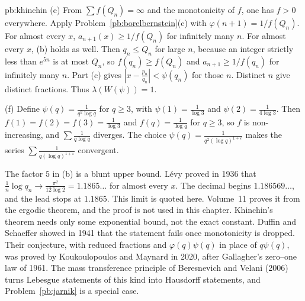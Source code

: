\begin{solution}{pb:khinchin}
(e) From $\sum f(Q_n)=\infty$ and the monotonicity of $f$, one has $f>0$ everywhere. Apply Problem~\ref{pb:borelbernstein}(c) with $\varphi(n+1)=1/f(Q_n)$. For almost every $x$, $a_{n+1}(x)\ge 1/f(Q_n)$ for infinitely many $n$. For almost every $x$, (b) holds as well. Then $q_n\le Q_n$ for large $n$, because an integer strictly less than $e^{5n}$ is at most $Q_n$, so $f(q_n)\ge f(Q_n)$ and $a_{n+1}\ge 1/f(q_n)$ for infinitely many $n$. Part (c) gives $|x-\frac{p_n}{q_n}|<\psi(q_n)$ for those $n$. Distinct $n$ give distinct fractions. Thus $\lambda(W(\psi))=1$.

(f) Define $\psi(q)=\frac1{q^2\log q}$ for $q\ge 3$, with $\psi(1)=\frac1{\log 3}$ and $\psi(2)=\frac1{4\log 3}$. Then $f(1)=f(2)=f(3)=\frac1{\log 3}$ and $f(q)=\frac1{\log q}$ for $q\ge 3$, so $f$ is non-increasing, and $\sum\frac1{q\log q}$ diverges. The choice $\psi(q)=\frac1{q^2(\log q)^{1+\varepsilon}}$ makes the series $\sum\frac1{q(\log q)^{1+\varepsilon}}$ convergent.

\leads The factor $5$ in (b) is a blunt upper bound. Lévy proved in 1936 that $\frac1n\log q_n\to\frac{\pi^2}{12\log 2}=1.1865\ldots$ for almost every $x$. The decimal begins $1.186569\ldots$, and the lead stops at $1.1865$. This limit is quoted here. Volume~11 proves it from the ergodic theorem, and the proof is not used in this chapter. Khinchin's theorem needs only some exponential bound, not the exact constant. Duffin and Schaeffer showed in 1941 that the statement fails once monotonicity is dropped. Their conjecture, with reduced fractions and $\varphi(q)\psi(q)$ in place of $q\psi(q)$, was proved by Koukoulopoulos and Maynard in 2020, after Gallagher's zero--one law of 1961. The mass transference principle of Beresnevich and Velani (2006) turns Lebesgue statements of this kind into Hausdorff statements, and Problem~\ref{pb:jarnik} is a special case.
\end{solution}

